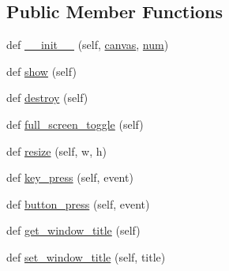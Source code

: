 \subsection*{Public Member Functions}
\begin{DoxyCompactItemize}
\item 
def \hyperlink{classmatplotlib_1_1backend__bases_1_1FigureManagerBase_a0ca0a73e11a64d448716a462ee7ed62f}{\+\_\+\+\_\+init\+\_\+\+\_\+} (self, \hyperlink{classmatplotlib_1_1backend__bases_1_1FigureManagerBase_ae355aa0633d6b4da5e2e698b007b4c3f}{canvas}, \hyperlink{classmatplotlib_1_1backend__bases_1_1FigureManagerBase_aba55ac119779c90c08e4034713892c63}{num})
\item 
def \hyperlink{classmatplotlib_1_1backend__bases_1_1FigureManagerBase_a488847b7268d48725b82935842c24bf2}{show} (self)
\item 
def \hyperlink{classmatplotlib_1_1backend__bases_1_1FigureManagerBase_a36863081686416dd6216b1b9e046ecbf}{destroy} (self)
\item 
def \hyperlink{classmatplotlib_1_1backend__bases_1_1FigureManagerBase_a6ca3de97fb51710b3115836e66e3a1b7}{full\+\_\+screen\+\_\+toggle} (self)
\item 
def \hyperlink{classmatplotlib_1_1backend__bases_1_1FigureManagerBase_a59d902f59e03e9d1811a1117e3fb6775}{resize} (self, w, h)
\item 
def \hyperlink{classmatplotlib_1_1backend__bases_1_1FigureManagerBase_ad966e08c9052186d1da97167fe212d0b}{key\+\_\+press} (self, event)
\item 
def \hyperlink{classmatplotlib_1_1backend__bases_1_1FigureManagerBase_a01e35daecd5ee4d413ec5c137f636f78}{button\+\_\+press} (self, event)
\item 
def \hyperlink{classmatplotlib_1_1backend__bases_1_1FigureManagerBase_ad957b3f4f041eee76b64cfd0709743c7}{get\+\_\+window\+\_\+title} (self)
\item 
def \hyperlink{classmatplotlib_1_1backend__bases_1_1FigureManagerBase_a39ebb6f9157b9eb8e101c5a4f20876d0}{set\+\_\+window\+\_\+title} (self, title)
\end{DoxyCompactItemize}
